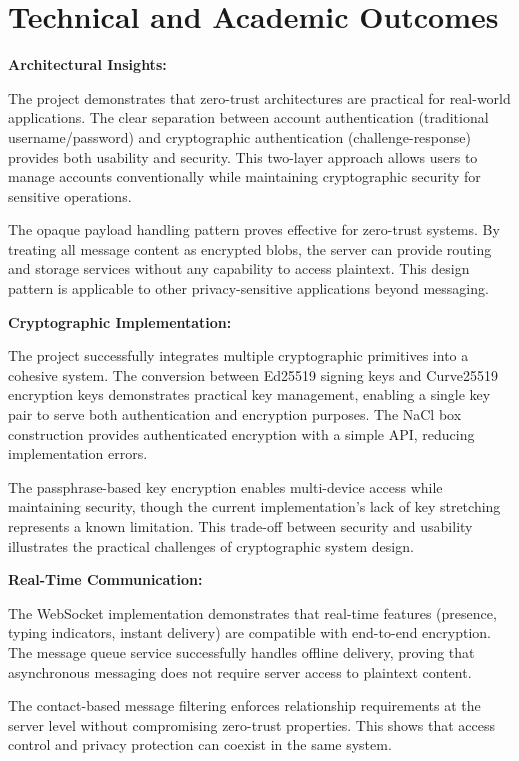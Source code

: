 \section*{Technical and Academic Outcomes}

\textbf{Architectural Insights:}

The project demonstrates that zero-trust architectures are practical for real-world applications. The clear separation between account authentication (traditional username/password) and cryptographic authentication (challenge-response) provides both usability and security. This two-layer approach allows users to manage accounts conventionally while maintaining cryptographic security for sensitive operations.

The opaque payload handling pattern proves effective for zero-trust systems. By treating all message content as encrypted blobs, the server can provide routing and storage services without any capability to access plaintext. This design pattern is applicable to other privacy-sensitive applications beyond messaging.

\textbf{Cryptographic Implementation:}

The project successfully integrates multiple cryptographic primitives into a cohesive system. The conversion between Ed25519 signing keys and Curve25519 encryption keys demonstrates practical key management, enabling a single key pair to serve both authentication and encryption purposes. The NaCl box construction provides authenticated encryption with a simple API, reducing implementation errors.

The passphrase-based key encryption enables multi-device access while maintaining security, though the current implementation's lack of key stretching represents a known limitation. This trade-off between security and usability illustrates the practical challenges of cryptographic system design.

\textbf{Real-Time Communication:}

The WebSocket implementation demonstrates that real-time features (presence, typing indicators, instant delivery) are compatible with end-to-end encryption. The message queue service successfully handles offline delivery, proving that asynchronous messaging does not require server access to plaintext content.

The contact-based message filtering enforces relationship requirements at the server level without compromising zero-trust properties. This shows that access control and privacy protection can coexist in the same system.

